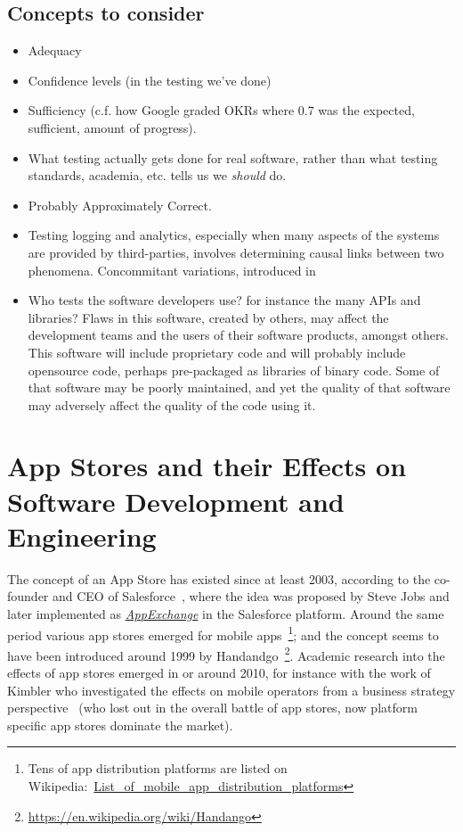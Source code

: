 \subsection{Concepts to consider}
\begin{itemize}
    \item Adequacy
    \item Confidence levels (in the testing we've done)
    \item Sufficiency (c.f. how Google graded OKRs where 0.7 was the expected, sufficient, amount of progress).
    \item What testing actually gets done for real software, rather than what testing standards, academia, etc. tells us we \emph{should} do.
    \item Probably Approximately Correct.
    \item Testing logging and analytics, especially when many aspects of the systems are provided by third-parties, involves determining causal links between two phenomena. Concommitant variations, introduced in~\cite{mill1884system}
    \item Who tests the software developers use? for instance the many APIs and libraries? Flaws in this software, created by others, may affect the development teams and the users of their software products, amongst others. This software will include proprietary code and will probably include opensource code, perhaps pre-packaged as libraries of binary code. Some of that software may be poorly maintained, and yet the quality of that software may adversely affect the quality of the code using it. 
\end{itemize}

\section{App Stores and their Effects on Software Development and Engineering}
The concept of an App Store has existed since at least 2003, according to the co-founder and CEO of Salesforce~\cite{benioff_trailblazer_2019}, where the idea was proposed by Steve Jobs and later implemented as \href{https://appexchange.salesforce.com/}{\emph{AppExchange}} in the Salesforce platform. Around the same period various app stores emerged for mobile apps~\footnote{Tens of app distribution platforms are listed on Wikipedia:~\href{https://en.wikipedia.org/wiki/List_of_mobile_app_distribution_platforms}{List\_of\_mobile\_app\_distribution\_platforms}}; and the concept seems to have been introduced around 1999 by Handandgo~\footnote{\url{https://en.wikipedia.org/wiki/Handango}}. Academic research into the effects of app stores emerged in or around 2010, for instance with the work of Kimbler who investigated the effects on mobile operators from a business strategy perspective~\cite{kimbler_app_store_strategies_2010} (who lost out in the overall battle of app stores, now platform specific app stores dominate the market). 

